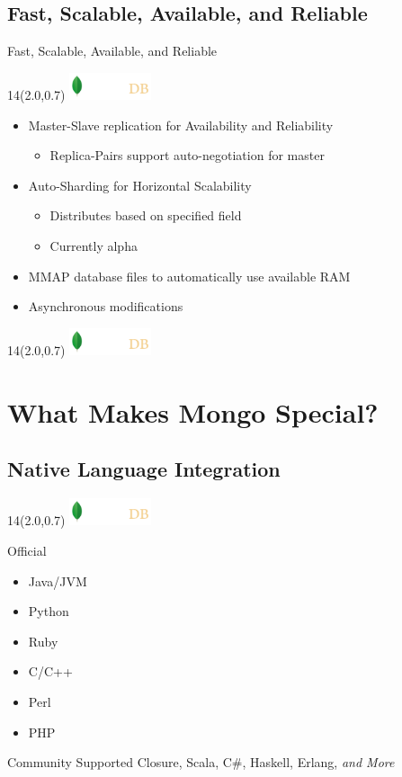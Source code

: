 \documentclass{beamer}
\newcommand{\MongoLogo}{
\begin{textblock}{14}(2.0,0.7)
  \includegraphics[height=0.8cm]{logo-mongodb-ondark.png}
\end{textblock}
}
\begin{document}
\subsection{Fast, Scalable, Available, and Reliable}
\begin{frame}{Fast, Scalable, Available, and Reliable}
  \MongoLogo
  \begin{itemize}
  \item Master-Slave replication for Availability and Reliability
    \begin{itemize}
      \item Replica-Pairs support auto-negotiation for master
    \end{itemize}
  \item Auto-Sharding for Horizontal Scalability
    \begin{itemize}
      \item Distributes based on specified field
      \item Currently alpha
    \end{itemize}
  \item MMAP database files to automatically use available RAM
  \item Asynchronous modifications
  \end{itemize}
\end{frame}

\begin{frame}
  \MongoLogo
  \center
\end{frame}

\section{What Makes Mongo Special?}

\subsection{Native Language Integration}

\begin{frame}
  \MongoLogo
  \begin{block}{Official}
    \begin{itemize}
      \item Java/JVM
      \item Python
      \item Ruby
      \item C/C++
      \item Perl
      \item PHP
    \end{itemize}
  \end{block}

  \begin{block}{Community Supported}
    Closure, 
    Scala,
    C\#,
    Haskell,
    Erlang,
    {\it and More}
  \end{block}
\end{frame}
\end{document}
